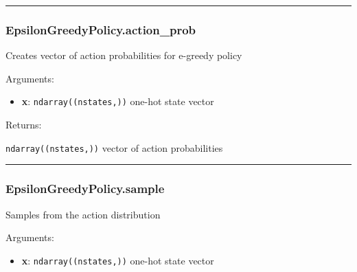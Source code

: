 \begin{center}\rule{0.5\linewidth}{\linethickness}\end{center}

\subsubsection{EpsilonGreedyPolicy.action\_prob}\label{epsilongreedypolicy.action_prob}

\begin{Shaded}
\begin{Highlighting}[]
\end{Highlighting}
\end{Shaded}

Creates vector of action probabilities for e-greedy policy

Arguments:

\begin{itemize}
\tightlist
\item
  \textbf{x}: \texttt{ndarray((nstates,))} one-hot state vector
\end{itemize}

Returns:

\texttt{ndarray((nstates,))} vector of action probabilities

\begin{center}\rule{0.5\linewidth}{\linethickness}\end{center}

\subsubsection{EpsilonGreedyPolicy.sample}\label{epsilongreedypolicy.sample}

\begin{Shaded}
\begin{Highlighting}[]
\end{Highlighting}
\end{Shaded}

Samples from the action distribution

Arguments:

\begin{itemize}
\tightlist
\item
  \textbf{x}: \texttt{ndarray((nstates,))} one-hot state vector
\end{itemize}

